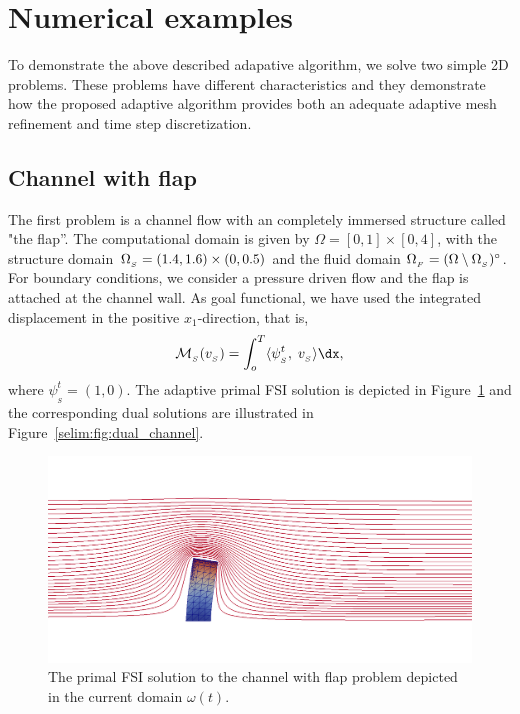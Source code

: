 \section{Numerical examples}

To demonstrate the above described adapative algorithm, we solve two
simple 2D problems. These problems have different characteristics and
they demonstrate how the proposed adaptive algorithm provides both
an adequate adaptive mesh refinement and time step discretization.

\subsection{Channel with flap}

The first problem is a channel flow with an completely immersed
structure called "the flap''. The computational domain is given by
$\Omega = [0, 1]\times [0,4]$, with the structure domain $\Omega_{_{S}} = (1.4,
1.6)\times (0, 0.5)$ and the fluid domain $\Omega_{_{F}} = (\Omega\setminus
\Omega_{_{S}})^{\circ}$. For boundary conditions, we consider a pressure driven
flow and the flap is attached at the channel wall. As goal functional,
we have used the integrated displacement in the positive
$x_1$-direction, that is,
\begin{equation}
\label{selim:eq:goalfunctional_channel}
\M_{_{S}}(v_{_{S}}) = \int_o^T \langle \psi^t_{_{S}},\;
v_{_{S}}\rangle \dx,
\end{equation}
where $\psi^t_{_{S}} = (1,0)$. The adaptive primal FSI solution is
depicted in Figure~\ref{selim:fig:primal_channel} and the
corresponding dual solutions are illustrated in
Figure~\ref{selim:fig:dual_channel}.
\begin{figure}
  \label{selim:fig:primal_channel}
  \caption{The primal FSI solution to the channel with flap problem
    depicted in the current domain $\omega(t)$.}
  \includegraphics[width=1.0\textwidth]{chapters/selim/png/channel.png}
\end{figure}

